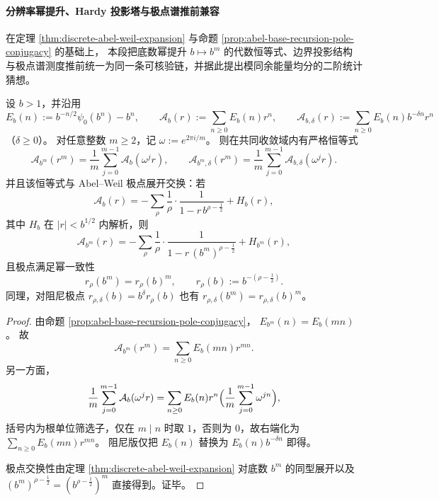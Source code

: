 \paragraph{分辨率幂提升、Hardy 投影塔与极点谱推前兼容}\label{par:xi-discrete-abel-weil-resolution-projection-spectrum}
在定理 \ref{thm:discrete-abel-weil-expansion} 与命题
\ref{prop:abel-base-recursion-pole-conjugacy} 的基础上，
本段把底数幂提升 \(b\mapsto b^m\) 的代数恒等式、边界投影结构与极点谱测度推前统一为同一条可核验链，并据此提出模同余能量均分的二阶统计猜想。

\begin{theorem}[分辨率幂提升下的精确重整化恒等式]\label{thm:abel-resolution-power-renormalization-identity}
设 \(b>1\)，并沿用
\[
E_b(n):=b^{-n/2}\psi_0(b^n)-b^n,\qquad
\mathcal A_b(r):=\sum_{n\ge 0}E_b(n)r^n,\qquad
\mathcal A_{b,\delta}(r):=\sum_{n\ge 0}E_b(n)b^{-\delta n}r^n
\]
（\(\delta\ge 0\)）。
对任意整数 \(m\ge 2\)，记 \(\omega:=e^{2\pi i/m}\)。
则在共同收敛域内有严格恒等式
\begin{equation}\label{eq:abel-resolution-power-renormalization-identity}
\boxed{
\mathcal A_{b^m}(r^m)=\frac1m\sum_{j=0}^{m-1}\mathcal A_b(\omega^j r),\qquad
\mathcal A_{b^m,\delta}(r^m)=\frac1m\sum_{j=0}^{m-1}\mathcal A_{b,\delta}(\omega^j r).
}
\end{equation}
并且该恒等式与 Abel--Weil 极点展开交换：若
\[
\mathcal A_b(r)= -\sum_{\rho}\frac1{\rho}\cdot\frac1{1-r\,b^{\rho-\frac12}} +H_b(r),
\]
其中 \(H_b\) 在 \(|r|<b^{1/2}\) 内解析，则
\[
\mathcal A_{b^m}(r)= -\sum_{\rho}\frac1{\rho}\cdot\frac1{1-r\,(b^m)^{\rho-\frac12}} +H_{b^m}(r),
\]
且极点满足幂一致性
\[
r_\rho(b^m)=r_\rho(b)^m,\qquad r_\rho(b):=b^{-(\rho-\frac12)}.
\]
同理，对阻尼极点
\(
r_{\rho,\delta}(b)=b^\delta r_\rho(b)
\)
也有
\(
r_{\rho,\delta}(b^m)=r_{\rho,\delta}(b)^m
\)。
\end{theorem}

\begin{proof}
由命题 \ref{prop:abel-base-recursion-pole-conjugacy}，
\(
E_{b^m}(n)=E_b(mn)
\)。
故
\[
\mathcal A_{b^m}(r^m)=\sum_{n\ge 0}E_b(mn)r^{mn}.
\]
另一方面，
\[
\frac1m\sum_{j=0}^{m-1}\mathcal A_b(\omega^jr)
=\sum_{n\ge 0}E_b(n)r^n\Bigl(\frac1m\sum_{j=0}^{m-1}\omega^{jn}\Bigr),
\]
括号内为根单位筛选子，仅在 \(m\mid n\) 时取 \(1\)，否则为 \(0\)，故右端化为
\(\sum_{n\ge 0}E_b(mn)r^{mn}\)。
阻尼版仅把 \(E_b(n)\) 替换为 \(E_b(n)b^{-\delta n}\) 即得。

极点交换性由定理 \ref{thm:discrete-abel-weil-expansion} 对底数 \(b^m\) 的同型展开以及
\(
(b^m)^{\rho-\frac12}=(b^{\rho-\frac12})^m
\)
直接得到。证毕。
\end{proof}

